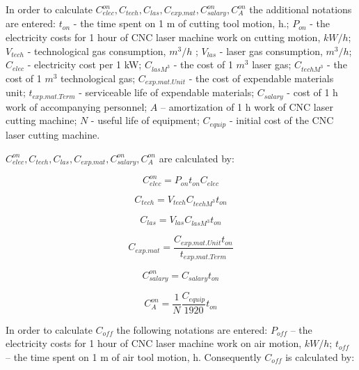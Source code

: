 \documentclass[runningheads]{llncs}
\begin{document}
In order to calculate
$C^{on}_{elec}, C_{tech}, C_{las}, C_{exp.mat}, C^{on}_{salary}, C^{on}_A$
the additional notations are entered:
$t_{on}$  - the time spent on 1 m of cutting tool motion, h.;
$P_{on}$  - the electricity costs for 1 hour of CNC laser machine work on cutting motion, $kW/h$;
$V_{tech}$  - technological gas consumption, $m^3/h$ ;
$V_{las}$ - laser gas consumption, $m^3/h$;
$C_{elec}$  - electricity cost per 1 kW;
$C_{las M^3}$  - the cost of 1 $m^3$ laser gas;
$C_{tech M^3}$  - the cost of 1 $m^3$ technological gas;
$C_{exp.mat.Unit}$  - the cost of expendable materials unit;
$t_{exp.mat.Term}$  - serviceable life of expendable materials;
$C_{salary}$ - cost of 1 h work of accompanying personnel;
$A$ – amortization of 1 h work of CNC laser cutting machine;
$N$ - useful life of equipment;
$C_{equip}$  - initial cost of the CNC laser cutting machine.

$C^{on}_{elec}, C_{tech}, C_{las}, C_{exp.mat}, C^{on}_{salary}, C^{on}_A$
are calculated by:

\begin{equation}
\label{eq1.4}
C^{on}_{elec} = P_{on} t_{on} C_{elec}
\end{equation}

\begin{equation}
  \label{eq1.5}
  C_{tech} = V_{tech} C_{tech M^3} t_{on}
\end{equation}

\begin{equation}
  \label{eq1.6}
  C_{las} = V_{las} C_{las M^3} t_{on}
\end{equation}

\begin{equation}
  \label{eq1.7}
  C_{exp.mat} = \frac{C_{exp.mat.Unit} t_{on}}{t_{exp.mat.Term}}
\end{equation}

\begin{equation}
  \label{eq1.8}
  C^{on}_{salary} = C_{salary} t_{on}
\end{equation}

\begin{equation}
  \label{eq1.9}
  C^{on}_A = \frac{1}N \frac{C_{equip}}{1920} t_{on}
\end{equation}

In order to calculate $C_{off}$
the following notations are entered:
$P_{off}$ – the electricity costs for 1 hour of CNC laser machine work on air motion, $kW/h$;
$t_{off}$ – the time spent on 1 m of air tool motion, h.
Consequently
$C_{off}$
is calculated by:
\end{document}
